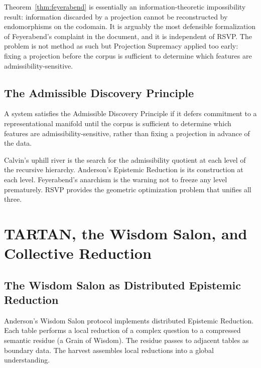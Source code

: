 \documentclass[12pt, a4paper, oneside]{book}
\begin{document}
\begin{remark}
Theorem~\ref{thm:feyerabend} is essentially an information-theoretic
impossibility result: information discarded by a projection cannot be
reconstructed by endomorphisms on the codomain. It is arguably the most
defensible formalization of Feyerabend's complaint in the document, and
it is independent of RSVP. The problem is not method as such but
Projection Supremacy applied too early: fixing a projection before the
corpus is sufficient to determine which features are admissibility-sensitive.
\end{remark}

\section{The Admissible Discovery Principle}

\begin{definition}
\label{def:adp}
A system satisfies the Admissible Discovery Principle if it defers
commitment to a representational manifold until the corpus is sufficient
to determine which features are admissibility-sensitive, rather than
fixing a projection in advance of the data.
\end{definition}

\noindent Calvin's uphill river is the search for the admissibility
quotient at each level of the recursive hierarchy. Anderson's Epistemic
Reduction is its construction at each level. Feyerabend's anarchism is
the warning not to freeze any level prematurely. RSVP provides the
geometric optimization problem that unifies all three.

\chapter{TARTAN, the Wisdom Salon, and Collective Reduction}
\label{ch:tartan}

\section{The Wisdom Salon as Distributed Epistemic Reduction}

Anderson's Wisdom Salon protocol implements distributed Epistemic
Reduction. Each table performs a local reduction of a complex question
to a compressed semantic residue (a Grain of Wisdom). The residue passes
to adjacent tables as boundary data. The harvest assembles local
reductions into a global understanding.
\end{document}
